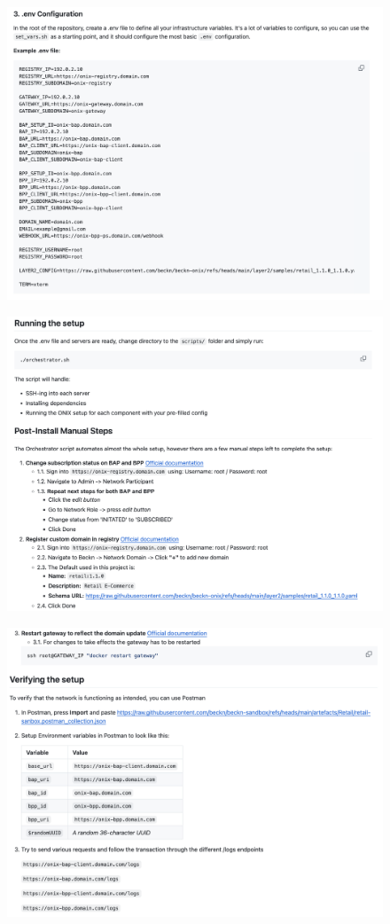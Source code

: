 \begin{figure}[h!]
    \centering
    \includegraphics[width=1\textwidth]{Images/readme_3.png}
\end{figure}
\clearpage
\begin{figure}[h!]
    \centering
    \includegraphics[width=1\textwidth]{Images/readme_4.png}
\end{figure}
\clearpage
\begin{figure}[h!]
    \centering
    \includegraphics[width=1\textwidth]{Images/readme_5.png}
\end{figure}

\label{lastpage} %
